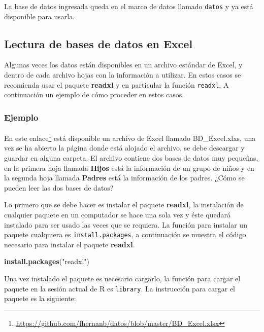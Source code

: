 \documentclass[10pt,]{krantz}
\makeatletter
\newenvironment{Shaded}{\begin{snugshade}}{\end{snugshade}}
\newcommand{\KeywordTok}[1]{\textcolor[rgb]{0.13,0.29,0.53}{\textbf{#1}}}
\newcommand{\StringTok}[1]{\textcolor[rgb]{0.31,0.60,0.02}{#1}}
\newcommand{\NormalTok}[1]{#1}
\let\rmarkdownfootnote\footnote%
\def\footnote{\protect\rmarkdownfootnote}
\renewcommand{\href}[2]{#2\footnote{\url{#1}}}
\newenvironment{kframe}{%
\medskip{}
\setlength{\fboxsep}{.8em}
 \def\at@end@of@kframe{}%
 \ifinner\ifhmode%
  \def\at@end@of@kframe{\end{minipage}}%
  \begin{minipage}{\columnwidth}%
 \fi\fi%
 \def\FrameCommand##1{\hskip\@totalleftmargin \hskip-\fboxsep
 \colorbox{shadecolor}{##1}\hskip-\fboxsep
     \hskip-\linewidth \hskip-\@totalleftmargin \hskip\columnwidth}%
 \MakeFramed {\advance\hsize-\width
   \@totalleftmargin\z@ \linewidth\hsize
   \@setminipage}}%
 {\par\unskip\endMakeFramed%
 \at@end@of@kframe}
\renewenvironment{Shaded}{\begin{kframe}}{\end{kframe}}
\makeatother
\begin{document}
La base de datos ingresada queda en el marco de datos llamado
\texttt{datos} y ya está disponible para usarla.

\subsection{Lectura de bases de datos en
Excel}\label{lectura-de-bases-de-datos-en-excel}

Algunas veces los datos están disponibles en un archivo estándar de
Excel, y dentro de cada archivo hojas con la información a utilizar. En
estos casos se recomienda usar el paquete \textbf{readxl}
\citep{R-readxl} y en particular la función \texttt{readxl}. A
continuación un ejemplo de cómo proceder en estos casos.

\subsubsection*{Ejemplo}\label{ejemplo-11}

En este
\href{https://github.com/fhernanb/datos/blob/master/BD_Excel.xlsx}{enlace}
está disponible un archivo de Excel llamado BD\_Excel.xlxs, una vez se
ha abierto la página donde está alojado el archivo, se debe descargar y
guardar en alguna carpeta. El archivo contiene dos bases de datos muy
pequeñas, en la primera hoja llamada \textbf{Hijos} está la información
de un grupo de niños y en la segunda hoja llamada \textbf{Padres} está
la información de los padres. ¿Cómo se pueden leer las dos bases de
datos?

Lo primero que se debe hacer es instalar el paquete \textbf{readxl}, la
instalación de cualquier paquete en un computador se hace una sola vez y
éste quedará instalado para ser usado las veces que se requiera. La
función para instalar un paquete cualquiera es
\texttt{install.packages}, a continuación se muestra el código necesario
para instalar el paquete \textbf{readxl}.

\begin{Shaded}
\begin{Highlighting}[]
\KeywordTok{install.packages}\NormalTok{(}\StringTok{"readxl"}\NormalTok{)}
\end{Highlighting}
\end{Shaded}

Una vez instalado el paquete es necesario cargarlo, la función para
cargar el paquete en la sesión actual de R es \texttt{library}. La
instrucción para cargar el paquete es la siguiente:
\end{document}
